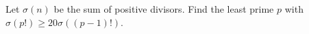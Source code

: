 Let $\sigma(n)$ be the sum of positive divisors. Find the least prime $p$ with $\sigma(p!)\ge20\sigma((p-1)!)$.

